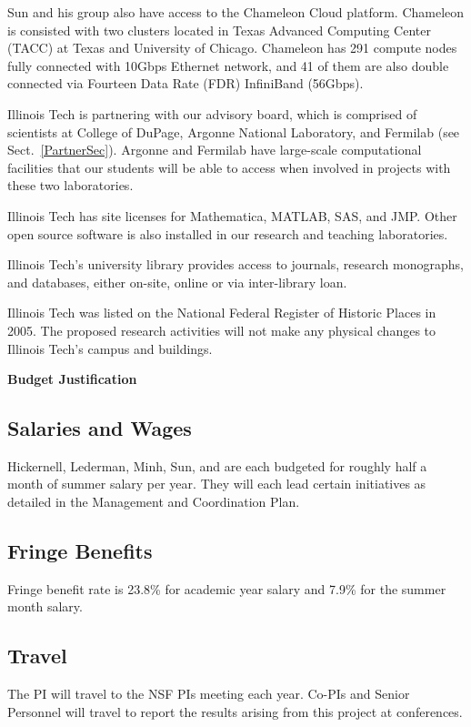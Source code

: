 \documentclass[11pt]{NSFamsart}
\begin{document}
Sun and his group also have access to the Chameleon Cloud platform. Chameleon is consisted with two clusters located in Texas Advanced Computing Center (TACC) at Texas and University of Chicago. Chameleon has 291 compute nodes fully connected with 10Gbps Ethernet network, and 41 of them are also double connected via Fourteen Data Rate (FDR) InfiniBand (56Gbps).



Illinois Tech is partnering with our advisory board, which is comprised of scientists at College of DuPage, Argonne National Laboratory, and Fermilab (see Sect.~\ref{PartnerSec}).  Argonne and Fermilab have large-scale computational facilities that our students will be able to access when involved in projects with these two laboratories.

Illinois Tech has site licenses for Mathematica, MATLAB, SAS, and JMP.  Other open source software is also installed in our research and teaching laboratories.

Illinois Tech's university library provides access to journals, research monographs, and databases, either on-site, online or via inter-library loan.

Illinois Tech was listed on the National Federal Register of Historic Places in 2005. The proposed research activities will not make any physical changes to Illinois Tech's campus and buildings.


\newpage \setcounter{page}{1} %

\centerline{\textbf{\Large Budget Justification}}
\hypertarget{BudgetJust}{}

\subsection*{Salaries and Wages}

Hickernell, Lederman, Minh, Sun, and \JW are each budgeted for roughly half a month of summer salary per year.  They will each lead certain initiatives as detailed in the Management and Coordination Plan.

\subsection*{Fringe Benefits}
Fringe benefit rate is 23.8\% for academic year salary and 7.9\% for the summer month
salary.

\subsection*{Travel}
The PI will travel to the NSF PIs meeting each year.  Co-PIs and Senior Personnel will travel to report the results arising from this project at conferences.
\end{document}
